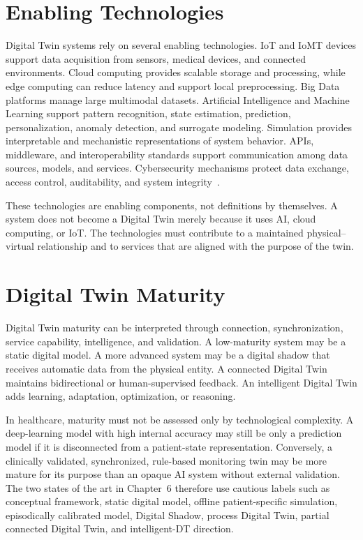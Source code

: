 \section{Enabling Technologies}
Digital Twin systems rely on several enabling technologies. IoT and IoMT devices support data acquisition from sensors, medical devices, and connected environments. Cloud computing provides scalable storage and processing, while edge computing can reduce latency and support local preprocessing. Big Data platforms manage large multimodal datasets. Artificial Intelligence and Machine Learning support pattern recognition, state estimation, prediction, personalization, anomaly detection, and surrogate modeling. Simulation provides interpretable and mechanistic representations of system behavior. APIs, middleware, and interoperability standards support communication among data sources, models, and services. Cybersecurity mechanisms protect data exchange, access control, auditability, and system integrity~\cite{fuller2020digital,tao2019digital,chaparro2025technological}.

These technologies are enabling components, not definitions by themselves. A system does not become a Digital Twin merely because it uses AI, cloud computing, or IoT. The technologies must contribute to a maintained physical--virtual relationship and to services that are aligned with the purpose of the twin.

\section{Digital Twin Maturity}
Digital Twin maturity can be interpreted through connection, synchronization, service capability, intelligence, and validation. A low-maturity system may be a static digital model. A more advanced system may be a digital shadow that receives automatic data from the physical entity. A connected Digital Twin maintains bidirectional or human-supervised feedback. An intelligent Digital Twin adds learning, adaptation, optimization, or reasoning.

In healthcare, maturity must not be assessed only by technological complexity. A deep-learning model with high internal accuracy may still be only a prediction model if it is disconnected from a patient-state representation. Conversely, a clinically validated, synchronized, rule-based monitoring twin may be more mature for its purpose than an opaque AI system without external validation. The two states of the art in Chapter~6 therefore use cautious labels such as conceptual framework, static digital model, offline patient-specific simulation, episodically calibrated model, Digital Shadow, process Digital Twin, partial connected Digital Twin, and intelligent-DT direction.

